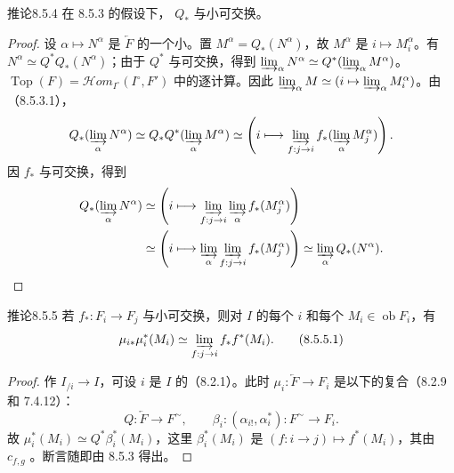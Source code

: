 \begin{SGAresult}{推论}{8.5.4}
在 8.5.3 的假设下， $Q_*$ 与小可交换。
\end{SGAresult}
\begin{proof}
设 $\alpha\mapsto N^\alpha$ 是 $\underleftarrow F$ 的一个小。置 $M^\alpha=Q_*(N^\alpha)$，故 $M^\alpha$ 是 $i\mapsto M_i^\alpha$。有 $N^\alpha\simeq Q^*Q_*(N^\alpha)$；由于 $Q^*$ 与可交换，得到 $\varinjlim_\alpha N^\alpha\simeq Q^*(\varinjlim_\alpha M^\alpha)$。$\operatorname{Top}(F)=\mathscr{H}\!om_{I^\circ}(I^\circ,F')$ 中的逐计算。因此 $\varinjlim_\alpha M\simeq(i\mapsto\varinjlim_\alpha M_i^\alpha)$。由（8.5.3.1），
\[
 Q_*(\varinjlim_\alpha N^\alpha)\simeq Q_*Q^*(\varinjlim_\alpha M^\alpha)
 \simeq\left(i\longmapsto\varinjlim_{f:j\to i}f_*(\varinjlim_\alpha M_j^\alpha)\right).
\]
因 $f_*$ 与可交换，得到
\[
\begin{split}
 Q_*(\varinjlim_\alpha N^\alpha)
 &\simeq\left(i\longmapsto\varinjlim_{f:j\to i}\varinjlim_\alpha f_*(M_j^\alpha)\right)\\
 &\simeq\left(i\longmapsto\varinjlim_\alpha\varinjlim_{f:j\to i}f_*(M_j^\alpha)\right)
 \simeq\varinjlim_\alpha Q_*(N^\alpha).
\end{split}
\]
\end{proof}

\begin{SGAresult}{推论}{8.5.5}
若 $f_*:F_i\to F_j$ 与小可交换，则对 $I$ 的每个 $i$ 和每个 $M_i\in\operatorname{ob}F_i$，有
\[
 \mu_{i*}\mu_i^*(M_i)\simeq\varinjlim_{f:j\to i}f_*f^*(M_i).\tag{8.5.5.1}
\]
\end{SGAresult}
\begin{proof}
作 $I_{/i}\to I$，可设 $i$ 是 $I$ 的（8.2.1）。此时 $\mu_i:\underleftarrow F\to F_i$ 是以下的复合（8.2.9 和 7.4.12）：
\[
 Q:\underleftarrow F\longrightarrow F^\sim,\qquad
 \beta_i:(\alpha_{i!},\alpha_i^*):F^\sim\longrightarrow F_i.
\]
故 $\mu_i^*(M_i)\simeq Q^*\beta_i^*(M_i)$，这里 $\beta_i^*(M_i)$ 是 $(f:i\to j)\mapsto f^*(M_i)$，其由 $c_{f,g}$ 。断言随即由 8.5.3 得出。
\end{proof}

